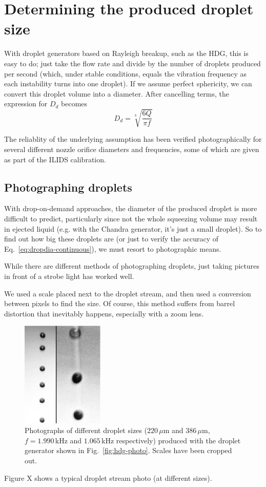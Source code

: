 \documentclass[11.5pt]{book}
\newcommand*{\figref}[1]{Fig.~\ref{#1}}
\begin{document}
\section{Determining the produced droplet size}
With droplet generators based on Rayleigh breakup, such as the HDG, this is easy
to do; just take the flow rate and divide by the number of droplets produced per
second (which, under stable conditions, equals the vibration frequency as each
instability turns into one droplet). If we assume perfect sphericity, we can
convert this droplet volume into a diameter. After cancelling terms, the
expression for $D_d$ becomes
\begin{equation}
    D_{d} = \sqrt[3]{\frac{6Q}{\pi f}}\label{eq:dropdia-continuous}
\end{equation}

The reliablity of the underlying assumption has been verified photographically
for several different nozzle orifice diameters and frequencies, some of which
are given as part of the ILIDS calibration.

\subsection{Photographing droplets}
With drop-on-demand approaches, the diameter of the produced droplet is more
difficult to predict, particularly since not the whole squeezing volume may
result in ejected liquid (e.g. with the Chandra generator, it's just a small
droplet). So to find out how big these droplets are (or just to verify the accuracy of
Eq.~\eqref{eq:dropdia-continuous}), we must resort to photographic means.

While there are different methods of photographing droplets, just taking
pictures in front of a strobe light has worked well.

We used a scale placed next to the droplet stream, and then used a conversion
between pixels to find the size. Of course, this method suffers from barrel
distortion that inevitably happens, especially with a zoom lens. 
\begin{figure}
\centering
\includegraphics[width=0.35\textwidth]{papers/hdg_images/photo.eps}
\caption{Photographs of different droplet sizes ($220\,\mu$m and $386\,\mu$m,
    $f=1.990\,$kHz and $1.065\,$kHz respectively) produced with the droplet
generator shown in \figref{fig:hdg-photo}. Scales have been cropped out.
\label{fig:hdg-dropphoto}}
\end{figure}
Figure X shows a typical droplet stream photo (at different sizes).
\end{document}

